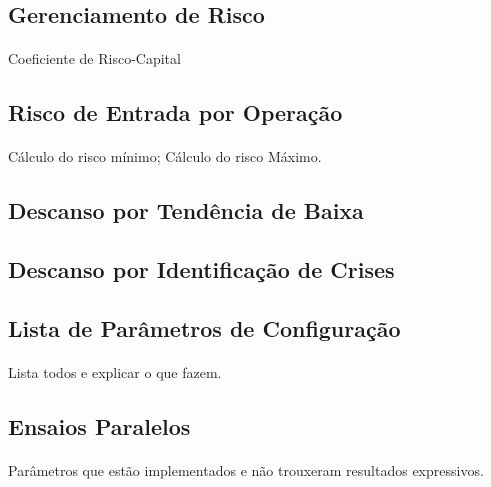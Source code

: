 \subsection{Gerenciamento de Risco}
\paragraph{} Coeficiente de Risco-Capital

\subsection{Risco de Entrada por Operação}
\paragraph{} Cálculo do risco mínimo; Cálculo do risco Máximo.

\subsection{Descanso por Tendência de Baixa}
\paragraph{}

\subsection{Descanso por Identificação de Crises}
\paragraph{}

\subsection{Lista de Parâmetros de Configuração}
\paragraph{} Lista todos e explicar o que fazem.

\subsection{Ensaios Paralelos}
\paragraph{} Parâmetros que estão implementados e não trouxeram resultados expressivos.



